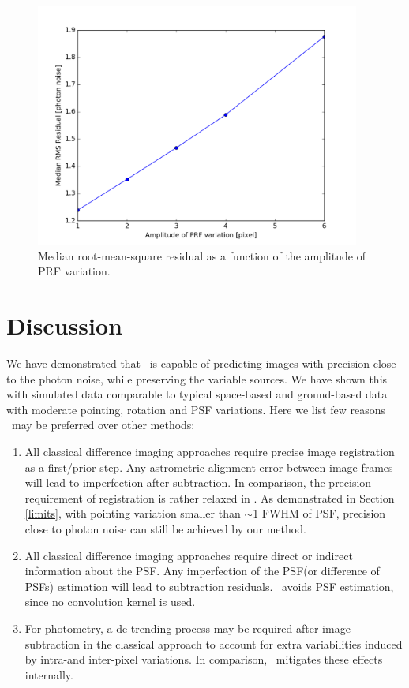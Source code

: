 \begin{figure}[p]
\begin{center}
\includegraphics[width=0.95\textwidth]{figures/cdi/prf_p}
\end{center}
\caption{
\label{prf_rms}
 Median root-mean-square residual as a function of the amplitude of PRF variation.
}
\end{figure}

\section{Discussion}
We have demonstrated that \cpmdiff\ is capable of predicting images with precision close to the photon noise, while preserving the variable sources. We have shown this with simulated data comparable to typical space-based and ground-based data with moderate pointing, rotation and PSF variations. 
Here we list few reasons \cpmdiff\ may be preferred over other methods:

\begin{enumerate}
\item All classical difference imaging approaches require precise image registration as a first/prior step. 
Any astrometric alignment error between image frames will lead to imperfection after subtraction.
In comparison, the precision requirement of registration is rather relaxed in \cpmdiff. 
As demonstrated in Section \ref{limits}, with pointing variation smaller than $\sim$1 FWHM of PSF, precision close to photon noise can still be achieved by our method.  

\item All classical difference imaging approaches require direct or indirect information about the PSF. 
Any imperfection of the PSF(or difference of PSFs) estimation will lead to subtraction residuals.
\cpmdiff\ avoids PSF estimation, since no convolution kernel is used.

\item For photometry, a de-trending process may be required after image subtraction in the classical approach to account for extra variabilities induced by intra-and inter-pixel variations.
In comparison, \cpmdiff\ mitigates these effects internally.
\end{enumerate}

